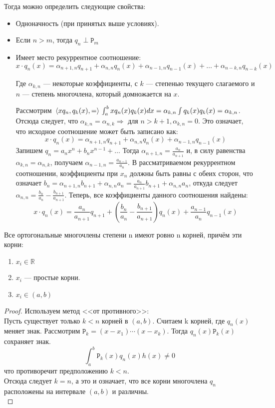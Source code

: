 	Тогда можно определить следующие свойства:
	\begin{itemize}
		\item Одноначность (при принятых выше условиях).
		\item Если $n > m$, тогда $q_n \perp \mathtt{P}_m$
		\item Имеет место рекуррентное соотношение: \\
		$$ x \cdot q_n(x) = 
		\alpha_{n+1,n} q_{n+1} + \alpha_{n,n} q_n(x) + \alpha_{n-1, n} q_{n-1} (x) + \ldots + \alpha_{n-k, n} q_{n-k} (x) $$
		
		Где $\alpha_{k, n}$ --- некоторые коэффициенты, с $k$ --- степенью текущего слагаемого и $n$ --- степень многочлена, который 
		домножается	на $x$.
		
		Рассмотрим $\, \langle x q_n, q_k(x), = \rangle \, \int_a^b x q_n(x) q_k(x) dx = \alpha_{k,n} \int q_k(x) q_k(x) = \alpha_{k,n}$.
		Отсюда следует, что $\alpha_{k,n} = \alpha_{n,k} \Rightarrow$ для $n > k+1,\alpha_{k,n} = 0$. Это означает, что исходное соотношение
		может быть записано как:
		$$ x \cdot q_n(x) = 
		\alpha_{n+1,n} q_{n+1} + \alpha_{n,n} q_n(x) + \alpha_{n-1, n} q_{n-1} (x)$$
		Запишем $q_n = a_n x^n + b_n x^{n-1} + \ldots$
		Тогда $\alpha_{n+1, n} = \frac{a_n}{a_{n+1}}$ и, в силу равенства $\alpha_{k,n} = \alpha_{n,k}$, получаем $\alpha_{n-1, n} 
		= \frac{a_{n-1}}{a_n}$. В рассматриваемом рекуррентном соотношении, коэффициенты при $x_n$ должны быть равны с обеих
		сторон, что означает $b_n = \alpha_{n+1, n} b_{n+1} + \alpha_{n,n} a_n = \frac{a_n}{a_{n+1}} b_{n+1} + \alpha_{n,n} a_n$, 
		откуда следует $\alpha_{n,n} = \frac{b_n}{a_n} - \frac{b_{n+1}}{a_{n+1}}$. Теперь, все коэффициенты данного соотношения
		найдены:
		$$ x \cdot q_n(x) = 
		\frac{a_n}{a_{n+1}} q_{n+1} + (\frac{b_n}{a_n} - \frac{b_{n+1}}{a_{n+1}}) q_n(x) + \frac{a_{n-1}}{a_n} q_{n-1} (x)$$
	\end{itemize}
	
	\begin{state}
		Все ортогональные многочлены степени n имеют ровно n корней, причём эти корни:
		\begin{enumerate}
			\item $x_i \in \mathbb{R}$
			\item $x_i$ --- простые корни.
			\item $x_i \in (a,b)$
		\end{enumerate}
		\begin{proof}
			Используем метод <<от противного>>: \\
			Пусть существует только $k < n$ корней в $(a,b)$. Считаем k корней, где $q_n(x)$ меняет знак. Рассмотрим 
			$\mathtt{P}_k = (x - x_1) \cdots (x - x_k)$. Тогда $q_n(x) \mathtt{P}_k(x)$ сохраняет знак. 
			$$ \int_a^b \mathtt{P}_k (x) q_n(x) h(x) \neq 0$$
			что противоречит предположению $k < n$. \\
			Отсюда следует $k = n$, а это и означает, что все корни многочлена $q_n$ расположены на интервале $(a,b)$ 
			и различны.\\
		\end{proof}
	\end{state}
